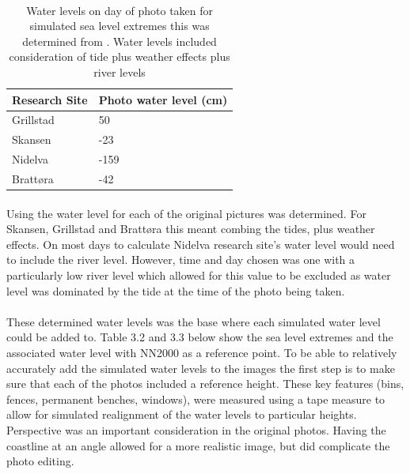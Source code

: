 \paragraph{}

\begin{table}[h!]
    \centering
    \begin{tabular}{|l|l|}
        \hline
     	Research Site & Photo water level (cm) \\ \hline
            Grillstad & 50 \\ \hline
            Skansen & -23 \\ \hline
            Nidelva & -159 \\ \hline
            Brattøra	& -42 \\ \hline
    \end{tabular}
    \caption{Water levels on day of photo taken for simulated sea level extremes this was determined from \cite{tides_high_2022}. Water levels included consideration of tide plus weather effects plus river levels}
    \label{tab:water_level_photo}
\end{table}
\paragraph{}

Using \cite{tides_high_2022} the water level for each of the original pictures was determined. For Skansen, Grillstad and Brattøra this meant combing the tides, plus weather effects. On most days to calculate Nidelva research site's water level would need to include the river level. However, time and day chosen was one with a particularly low river level which allowed for this value to be excluded as water level was dominated by the tide at the time of the photo being taken.   
\paragraph{}

These determined water levels was the base where each simulated water level could be added to. Table 3.2 and 3.3 below show the sea level extremes and the associated water level with NN2000 as a reference point.  To be able to relatively accurately add the simulated water levels to the images the first step is to make sure that each of the photos included a reference height. These key features (bins, fences, permanent benches, windows), were measured using a tape measure to allow for simulated realignment of the water levels to particular heights. Perspective was an important consideration in the original photos. Having the coastline at an angle allowed for a more realistic image, but did complicate the photo editing. 

